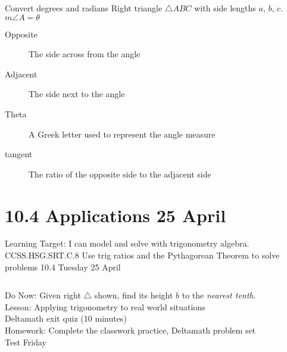 \documentclass[onlytextwidth, aspectratio=169]{beamer}
\begin{document}
\begin{frame}{Convert degrees and radians}
  Right triangle $\triangle ABC$ with side lengths $a$, $b$, $c$. $m\angle A = \theta$
  \begin{center}
  \end{center}
  \begin{description}
    \item[Opposite] The side across from the angle
    \item[Adjacent] The side next to the angle
    \item[Theta] A Greek letter used to represent the angle measure
    \item[tangent] The ratio of the opposite side to the adjacent side
  \end{description}
\end{frame}

\section{10.4 Applications \hfill 25 April \,}
\begin{frame}{Learning Target: I can model and solve with trigonometry algebra.}
  {CCSS.HSG.SRT.C.8 Use trig ratios and the Pythagorean Theorem to solve problems \hfill \alert{10.4 Tuesday 25 April}}
  \begin{columns}
    Do Now: Given right $\triangle$ shown, find its height $b$ to the \emph{nearest tenth}. \\[0.5cm]
    Lesson: Applying trigonometry to real world situations \\
    \alert{Deltamath exit quiz} (10 minutes) \\[0.5cm]
    Homework: Complete the classwork practice, Deltamath problem set \\
    \alert{Test Friday}
    \begin{flushright}
    \end{flushright}
  \end{columns}
\end{frame}
\end{document}
